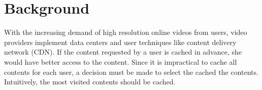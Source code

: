 \section{Background}
With the increasing demand of high resolution online videos from
users, video providers implement data centers and user techniques like
content delivery network (CDN). If the content requested by a user is
cached in advance, she would have better access to the content. Since
it is impractical to cache all contents for each user, a decision must
be made to select the cached the contents. Intuitively, the most
visited contents should be cached.



